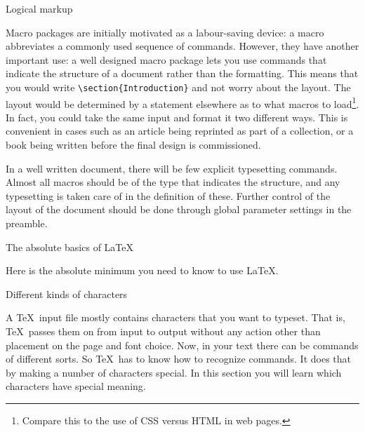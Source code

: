  {Logical markup}

Macro packages are initially motivated as a labour-saving device: a
macro abbreviates a commonly used sequence of commands. However, they
have another important use: a well designed macro package lets you use
commands that indicate the structure of a document rather than the
formatting. This means that you would write
\verb+\section{Introduction}+ and not worry about the layout. The
layout would be determined by a statement elsewhere as to what macros
to load\footnote{Compare this to the use of CSS versus HTML in web
  pages.}. In fact, you could take the same input and format it two
different ways. This is convenient in cases such as an article being
reprinted as part of a collection, or a book being written before the
final design is commissioned.

In a well written document, there will be few explicit typesetting
commands. Almost all macros should be of the type that indicates the
structure, and any typesetting is taken care of in the definition of
these. Further control of the layout of the document should be done
through global parameter settings in the preamble.

\pagebreak[2]
 {The absolute basics of \LaTeX}

Here is the absolute minimum you need to know to use \LaTeX.

 {Different kinds of characters}
\label{sec:character}

A \TeX\ input file mostly contains characters that you want to
typeset. That is, \TeX\ passes them on from input to output without
any action other than placement on the page and font choice. Now, in
your text there can be commands of different sorts. So \TeX\ has to
know how to recognize commands. It does that by making a number of
characters special. In this section you will learn which characters
have special meaning.

